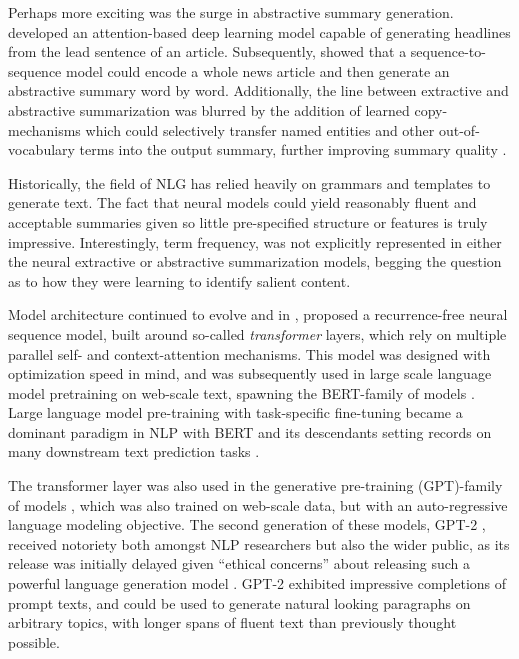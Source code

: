 Perhaps more exciting was the surge in abstractive summary generation.
\cite{rush2015} developed an attention-based deep learning  model capable of
generating headlines from the lead sentence of an article. Subsequently,
\citet{nallapati2016} showed that a sequence-to-sequence model could encode a
whole news article and then generate an abstractive summary word by word.
Additionally, the line between extractive and abstractive summarization was
blurred by the addition of learned copy-mechanisms which could selectively
transfer named entities and other out-of-vocabulary terms into the output
summary, further improving summary quality \citep{see2017}.  

Historically, the field of NLG has relied heavily on grammars and templates to
generate text. The fact that neural models could yield reasonably fluent and
acceptable summaries given so little pre-specified structure or features is
truly impressive.  Interestingly, term frequency, was not explicitly
represented in either the neural extractive or abstractive summarization
models, begging the question as to how they were learning to identify salient
content.

Model architecture continued to evolve and in \citeyear{vaswani2017},
\citeauthor{vaswani2017} proposed a recurrence-free neural sequence model,
built around so-called \textit{transformer} layers, which rely on multiple
parallel self- and context-attention mechanisms.  This model was designed with
optimization speed in mind, and was subsequently used in large scale language
model pretraining on web-scale text, spawning the BERT-family of models
\citep{devlin2019}. Large language model pre-training with task-specific
fine-tuning became a dominant paradigm in NLP with BERT and its descendants
setting records on many downstream text prediction tasks \citep{ruder2019}.

The transformer layer was also used in the generative pre-training
(GPT)-family of models \citep{radford2018improving}, which was  also trained
on web-scale data, but with an auto-regressive language modeling objective.
The second generation of these models, GPT-2 \citep{radford2019language},
received notoriety both amongst NLP researchers but also the wider public, as
its release was initially delayed given ``ethical concerns'' about releasing
such a powerful language generation model \citep{vincent2019,seabrook2019}.
GPT-2 exhibited impressive completions of prompt texts, and could be used to
generate natural looking paragraphs on arbitrary topics, with longer spans of
fluent text than previously thought possible. 
  
